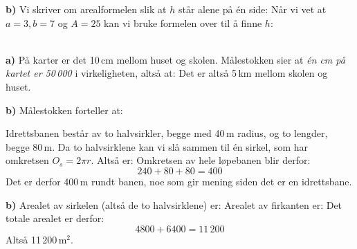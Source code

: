 \textbf{b)} Vi skriver om arealformelen slik at $ h $ står alene på én side: 
Når vi vet at $ {a=3, b=7} $ og $ A= 25$ kan vi bruke formelen over til å finne $ h $:

 \\
\textbf{a)} På karter er det 10\,cm mellom huset og skolen. Målestokken sier at \textsl{én cm på kartet er 50\,000} i virkeligheten, altså at:
Det er altså 5\,km mellom skolen og huset.\os

\textbf{b)} Målestokken forteller at:

Idrettsbanen består av to halvsirkler, begge med 40\,m radius, og to lengder, begge 80\,m. Da to halvsirklene kan vi slå sammen til én sirkel, som har omkretsen $O_s= 2\pi r $. Altså er:
Omkretsen av hele løpebanen blir derfor:
\[ 240+80+80=400 \]
Det er derfor 400\,m rundt banen, noe som gir mening siden det er en idrettsbane. \vsk

\textbf{b)} Arealet av sirkelen (altså de to halvsirklene) er:
Arealet av firkanten er:
Det totale arealet er derfor:
\[ 4800+6400=11\,200 \]
Altså 11\,200\,m$^2 $.






